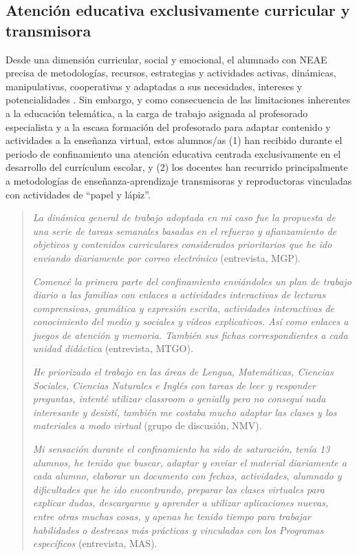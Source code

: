\documentclass[spanish]{textolivre}
\begin{document}
\subsection{Atención educativa exclusivamente curricular y transmisora}
Desde una dimensión curricular, social y emocional, el alumnado con NEAE precisa de metodologías, recursos, estrategias y actividades activas, dinámicas, manipulativas, cooperativas y adaptadas a sus necesidades, intereses y potencialidades \cite{gonzalez2020}. %
Sin embargo, y como consecuencia de las limitaciones inherentes a la educación telemática, a la carga de trabajo asignada al profesorado especialista y a la escasa formación del profesorado para adaptar contenido y actividades a la enseñanza virtual, estos alumnos/as (1) han recibido durante el periodo de confinamiento una atención educativa centrada exclusivamente en el desarrollo del currículum escolar, y (2) los docentes han recurrido principalmente a metodologías de enseñanza-aprendizaje transmisoras y reproductoras vinculadas con actividades de “papel y lápiz”.  

\begin{quote}
\emph{La dinámica general de trabajo adoptada en mi caso fue la propuesta de una serie de tareas semanales basadas en el refuerzo y afianzamiento de objetivos y contenidos curriculares considerados prioritarios que he ido enviando diariamente por correo electrónico} (entrevista, MGP).

\emph{Comencé la primera parte del confinamiento enviándoles un plan de trabajo diario a las familias con enlaces a actividades interactivas de lecturas comprensivas, gramática y expresión escrita, actividades interactivas de conocimiento del medio y sociales y vídeos explicativos. Así como enlaces a juegos de atención y memoria. También sus fichas correspondientes a cada unidad didáctica} (entrevista, MTGO).

\emph{He priorizado el trabajo en las áreas de Lengua, Matemáticas, Ciencias Sociales, Ciencias Naturales e Inglés con tareas de leer y responder preguntas, intenté utilizar classroom o genially pero no conseguí nada interesante y desistí, también me costaba mucho adaptar las clases y los materiales a modo virtual} (grupo de discusión, NMV).

\emph{Mi sensación durante el confinamiento ha sido de saturación, tenía 13 alumnos, he tenido que buscar, adaptar y enviar el material diariamente a cada alumno, elaborar un documento con fechas, actividades, alumnado y dificultades que he ido encontrando, preparar las clases virtuales para explicar dudas, descargarme y aprender a utilizar aplicaciones nuevas, entre otras muchas cosas, y apenas he tenido tiempo para trabajar habilidades o destrezas más prácticas y vinculadas con los Programas específicos} (entrevista, MAS). 
\end{quote}
\end{document}
